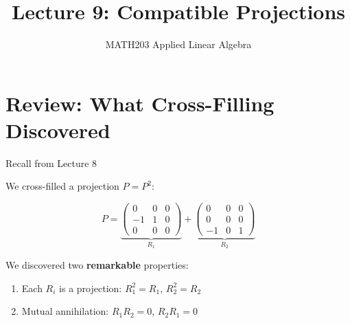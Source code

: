 \documentclass[10pt]{beamer}
\title{Lecture 9: Compatible Projections}
\subtitle{MATH203 Applied Linear Algebra}
\date{}
\theoremstyle{definition}
\newcommand{\x}[1]{\alert{\textbf{#1}}}
\begin{document}
\maketitle

\section{Review: What Cross-Filling Discovered}

\begin{frame}{Recall from Lecture 8}

We cross-filled a projection $P = P^2$:

$$P = \underbrace{\begin{pmatrix} 0 & 0 & 0 \\ -1 & 1 & 0 \\ 0 & 0 & 0 \end{pmatrix}}_{R_1} + \underbrace{\begin{pmatrix} 0 & 0 & 0 \\ 0 & 0 & 0 \\ -1 & 0 & 1 \end{pmatrix}}_{R_2}$$

\vspace{0.5em}

We discovered two \x{remarkable} properties:

\begin{enumerate}
\item Each $R_i$ is a projection: $R_1^2 = R_1$, $R_2^2 = R_2$
\item Mutual annihilation: $R_1 R_2 = 0$, $R_2 R_1 = 0$
\end{enumerate}

\end{frame}
\end{document}
